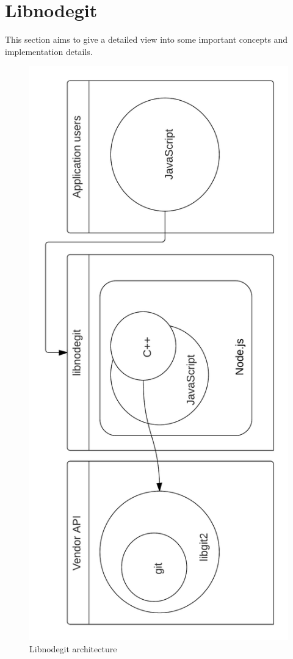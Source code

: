 \chapter{Libnodegit}

This section aims to give a detailed view into some important concepts and
implementation details.

\begin{figure}[htb]
  \centering
  \includegraphics[scale=0.27]{./diagrams/architecture.png}
  \caption{Libnodegit architecture}
  \label{fig:architecture}
\end{figure}

